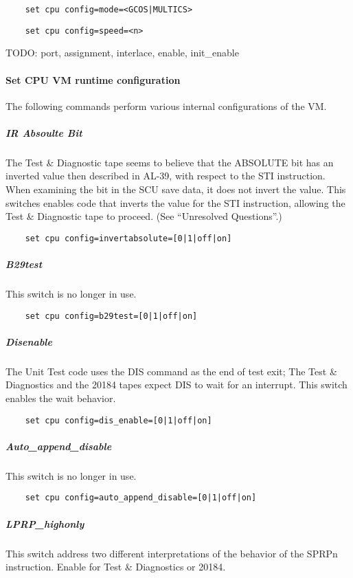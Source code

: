 \documentclass[notitlepage]{report}
\begin{document}
\begin{lstlisting}
	set cpu config=mode=<GCOS|MULTICS>
\end{lstlisting}

\begin{lstlisting}
	set cpu config=speed=<n>
\end{lstlisting}

TODO: port, assignment, interlace, enable, init\_enable

\paragraph{Set CPU VM runtime configuration} The following commands perform various internal configurations of the VM.

\subparagraph{IR Absoulte Bit}
The Test \& Diagnostic tape seems to believe that the ABSOLUTE bit has an inverted value then
described in AL-39, with respect to the STI instruction. When examining the bit in the SCU save data, it does not invert the value. This switches enables code that inverts the value for the STI instruction, allowing the Test \& Diagnostic tape to proceed. (See ``Unresolved Questions''.)

\begin{lstlisting}
	set cpu config=invertabsolute=[0|1|off|on]
\end{lstlisting}

\subparagraph{B29test}
This switch is no longer in use.

\begin{lstlisting}
	set cpu config=b29test=[0|1|off|on]
\end{lstlisting}

\subparagraph{Disenable}
The Unit Test code uses the DIS command as the end of test exit; The Test \& Diagnostics and the 20184 tapes expect DIS to wait for an interrupt. This switch enables the wait behavior.

\begin{lstlisting}
	set cpu config=dis_enable=[0|1|off|on]
\end{lstlisting}

\subparagraph{Auto\_append\_disable}
This switch is no longer in use.
\begin{lstlisting}
	set cpu config=auto_append_disable=[0|1|off|on]
\end{lstlisting}

\subparagraph{LPRP\_highonly}
This switch address two different interpretations of the behavior of the SPRPn instruction. Enable for Test \& Diagnostics or 20184.
\end{document}
